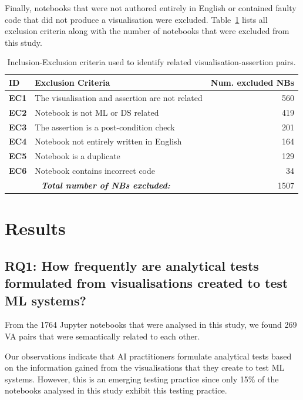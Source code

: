 \documentclass[conference]{IEEEtran}
\begin{document}
Finally, notebooks that were not authored entirely in English or contained faulty code that did not produce a visualisation were excluded. Table~\ref{tab:exclusion-criteria} lists all exclusion criteria along with the number of notebooks that were excluded from this study.

\begin{table}
  \centering
  \caption{Inclusion-Exclusion criteria used to identify related visualisation-assertion pairs.}\label{tab:exclusion-criteria}
  \begin{tabular}{l p{} r}
    \hline
    \textbf{ID} &
    \textbf{Exclusion Criteria} &
    \textbf{Num. excluded NBs}\\
    \hline
    \textbf{EC1} &
    The visualisation and assertion are not related &
    560\\
    \textbf{EC2} &
    Notebook is not ML or DS related &
    419\\
    \textbf{EC3} &
    The assertion is a post-condition check &
    201\\
    \textbf{EC4} &
    Notebook not entirely written in English &
    164\\
    \textbf{EC5} &
    Notebook is a duplicate &
    129\\
    \textbf{EC6} &
    Notebook contains incorrect code &
    34\\
    \hline
    \multicolumn{2}{c}{\emph{\textbf{Total number of NBs excluded:}}} &
    1507\\
    \hline
  \end{tabular}
\end{table}

\section{Results}\label{sec:result}
\subsection{RQ1: How frequently are analytical tests formulated from visualisations created to test ML systems?}\label{sec:result-rq1}

From the 1764 Jupyter notebooks that were analysed in this study, we found 269 VA pairs that were semantically related to each other.

Our observations indicate that AI practitioners formulate analytical tests based on the information gained from the visualisations that they create to test ML systems. However, this is an emerging testing practice since only 15\% of the notebooks analysed in this study exhibit this testing practice.
\end{document}
